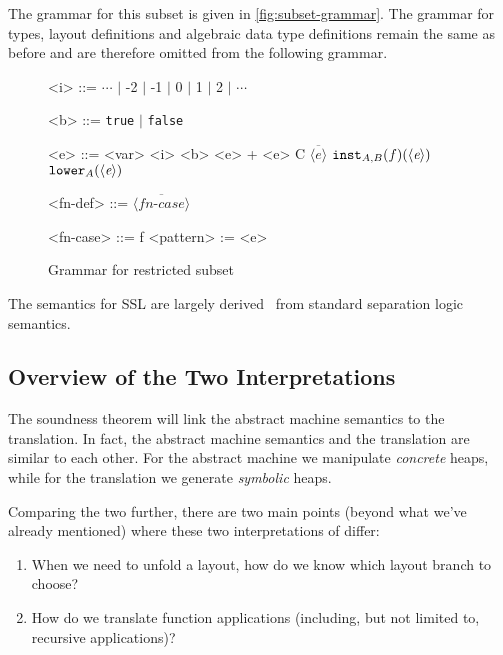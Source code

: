 The grammar for this subset is given in \autoref{fig:subset-grammar}. The grammar for types, layout definitions and algebraic data type definitions remain the same
as before and are therefore omitted from the following grammar.


\begin{figure}
\begin{grammar}
  <i> ::= $\cdots$ $\mid$ -2 $\mid$ -1 $\mid$ 0 $\mid$ 1 $\mid$ 2 $\mid$ $\cdots$

  <b> ::= \texttt{true} $\mid$ \texttt{false}

  <e> ::= <var> \alt <i> \alt <b> \alt <e> + <e> \alt C $\overline{\langle e \rangle}$ \alt $\texttt{inst}_{A,B}(f)(\langle \textit{e} \rangle)$ \alt $\texttt{lower}_{A}(\langle \textit{e} \rangle)$

  <fn-def> ::= $\overline{\langle \textit{fn-case} \rangle}$

  <fn-case> ::= f <pattern> := <e>
\end{grammar}
  \caption{Grammar for restricted \tool subset}
  \label{fig:subset-grammar}
\end{figure}

\noindent
The semantics for SSL are largely derived~\cite{polikarpova:2019:suslik} from standard separation logic semantics.~\cite{rowe:2017:auto-cyclic-term}

\subsection{Overview of the Two Interpretations}

The soundness theorem will link the abstract machine semantics to the translation. In fact, the abstract machine
semantics and the translation are similar to each other. For the abstract machine we manipulate \textit{concrete} heaps, while
for the translation we generate \textit{symbolic} heaps.

Comparing the two further, there are two main points (beyond what we've already mentioned) where these two interpretations of \tool differ:


      \begin{enumerate}
        \item When we need to unfold a layout, how do we know which layout branch to choose?
        \item How do we translate function applications (including, but not limited to, recursive applications)?
      \end{enumerate}

